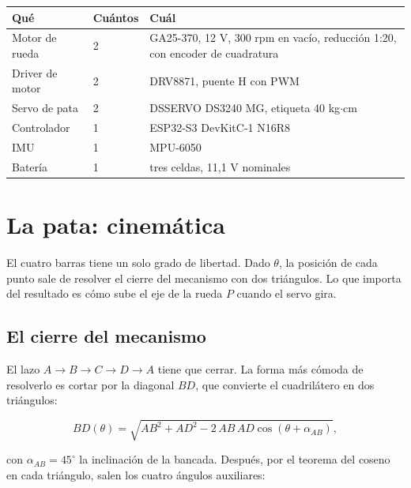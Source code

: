 \documentclass[11pt,a4paper]{report}
\begin{document}
\begin{center}
\small
\begin{tabular}{@{}llp{7.4cm}@{}}
\toprule
\textbf{Qué} & \textbf{Cuántos} & \textbf{Cuál} \\
\midrule
Motor de rueda & 2 & GA25-370, 12 V, 300 rpm en vacío, reducción 1:20, con encoder de
cuadratura \\
Driver de motor & 2 & DRV8871, puente H con PWM \\
Servo de pata & 2 & DSSERVO DS3240 MG, etiqueta 40 kg$\cdot$cm \\
Controlador & 1 & ESP32-S3 DevKitC-1 N16R8 \\
IMU & 1 & MPU-6050 \\
Batería & 1 & tres celdas, 11{,}1 V nominales \\
\bottomrule
\end{tabular}
\end{center}

\chapter{La pata: cinemática}\label{cap:cin}

\begin{idea}
El cuatro barras tiene un solo grado de libertad. Dado $\theta$, la posición de cada punto
sale de resolver el cierre del mecanismo con dos triángulos. Lo que importa del resultado es
cómo sube el eje de la rueda $P$ cuando el servo gira.
\end{idea}

\section{El cierre del mecanismo}

El lazo $A\!\to\!B\!\to\!C\!\to\!D\!\to\!A$ tiene que cerrar. La forma más cómoda de
resolverlo es cortar por la diagonal $BD$, que convierte el cuadrilátero en dos triángulos:

\begin{equation}
BD(\theta) = \sqrt{AB^2 + AD^2 - 2\,AB\,AD\cos(\theta + \alpha_{AB})},
\end{equation}

con $\alpha_{AB} = 45^\circ$ la inclinación de la bancada. Después, por el teorema del coseno
en cada triángulo, salen los cuatro ángulos auxiliares:
\end{document}
